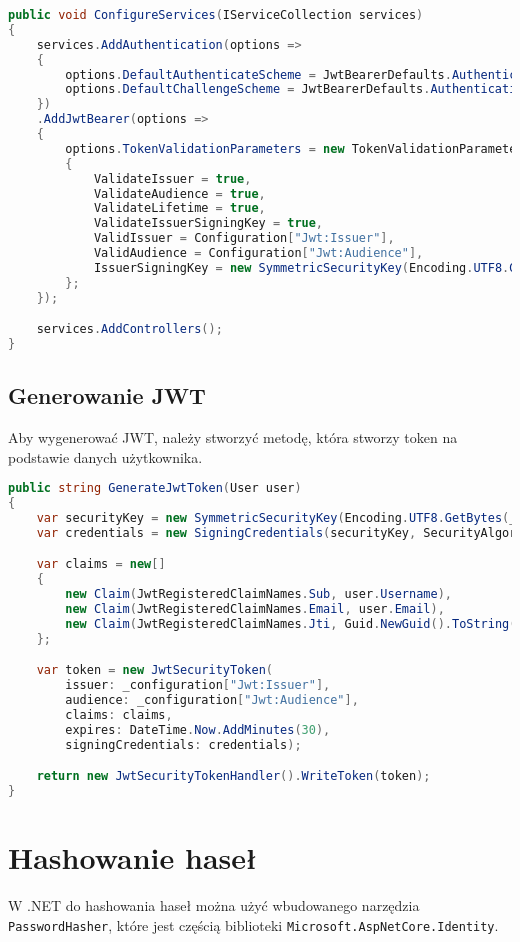 \documentclass[a4paper,12pt]{article}
\begin{document}
\begin{lstlisting}[language=C#, caption=Konfiguracja JWT]
public void ConfigureServices(IServiceCollection services)
{
    services.AddAuthentication(options =>
    {
        options.DefaultAuthenticateScheme = JwtBearerDefaults.AuthenticationScheme;
        options.DefaultChallengeScheme = JwtBearerDefaults.AuthenticationScheme;
    })
    .AddJwtBearer(options =>
    {
        options.TokenValidationParameters = new TokenValidationParameters
        {
            ValidateIssuer = true,
            ValidateAudience = true,
            ValidateLifetime = true,
            ValidateIssuerSigningKey = true,
            ValidIssuer = Configuration["Jwt:Issuer"],
            ValidAudience = Configuration["Jwt:Audience"],
            IssuerSigningKey = new SymmetricSecurityKey(Encoding.UTF8.GetBytes(Configuration["Jwt:Key"]))
        };
    });

    services.AddControllers();
}
\end{lstlisting}

\subsection{Generowanie JWT}
Aby wygenerować JWT, należy stworzyć metodę, która stworzy token na podstawie danych użytkownika.

\begin{lstlisting}[language=C#, caption=Przykład generowania JWT]
public string GenerateJwtToken(User user)
{
    var securityKey = new SymmetricSecurityKey(Encoding.UTF8.GetBytes(_configuration["Jwt:Key"]));
    var credentials = new SigningCredentials(securityKey, SecurityAlgorithms.HmacSha256);

    var claims = new[]
    {
        new Claim(JwtRegisteredClaimNames.Sub, user.Username),
        new Claim(JwtRegisteredClaimNames.Email, user.Email),
        new Claim(JwtRegisteredClaimNames.Jti, Guid.NewGuid().ToString())
    };

    var token = new JwtSecurityToken(
        issuer: _configuration["Jwt:Issuer"],
        audience: _configuration["Jwt:Audience"],
        claims: claims,
        expires: DateTime.Now.AddMinutes(30),
        signingCredentials: credentials);

    return new JwtSecurityTokenHandler().WriteToken(token);
}
\end{lstlisting}

\section{Hashowanie haseł}
W .NET do hashowania haseł można użyć wbudowanego narzędzia \texttt{PasswordHasher}, które jest częścią biblioteki \texttt{Microsoft.AspNetCore.Identity}.
\end{document}
